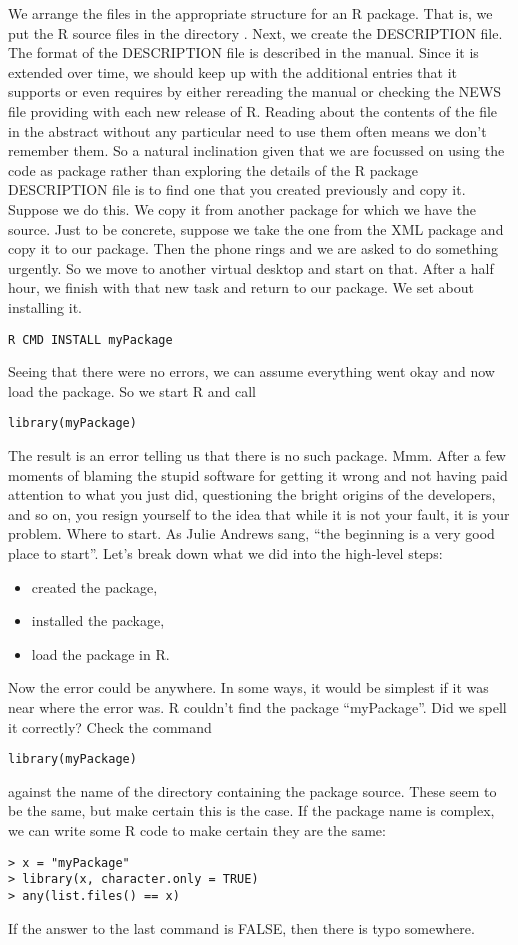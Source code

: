 We arrange the files in the appropriate structure for an R package.
That is, we put the R source files in the directory .  Next, we
create the DESCRIPTION file.  The format of the DESCRIPTION file is
described in the \cite{WritingRExtensions} manual. Since it is
extended over time, we should keep up with the additional entries that
it supports or even requires by either rereading the manual or
checking the NEWS file providing with each new release of R.  Reading
about the contents of the file in the abstract without any particular
need to use them often means we don't remember them.  So a natural
inclination given that we are focussed on using the code as package
rather than exploring the details of the R package DESCRIPTION file is
to find one that you created previously and copy it.  Suppose we do
this.  We copy it from another package for which we have the source.
Just to be concrete, suppose we take the one from the XML package and
copy it to our package.
Then the phone rings and we are asked to do something urgently.
So we move to another virtual desktop and start on that.
After a half hour, we finish with that new task and return to our
package. 
We set about installing it. 
\begin{verbatim}
R CMD INSTALL myPackage
\end{verbatim}
Seeing that there were no errors, we
can assume everything went okay and 
now load the package.
So we start R
and call
\begin{verbatim}
library(myPackage)
\end{verbatim}
The result is an error telling us that there is no such package.  Mmm.
After a few moments of blaming the stupid software for getting it
wrong and not having paid attention to what you just did, questioning
the bright origins of the developers, and so on, you resign yourself
to the idea that while it is not your fault, it is your problem.
Where to start.
As Julie Andrews sang, ``the beginning is a very good place to start''.
Let's break down what we did into the high-level steps:
\begin{itemize}
\item created the package,
\item installed the package,
\item load the package in R.
\end{itemize}
Now the error could be anywhere.
In some ways, it would be simplest if it
was near where the error was.
R couldn't find the package ``myPackage''.
Did we spell it correctly?
Check the command
\begin{verbatim}
library(myPackage)
\end{verbatim}
against the name of the directory 
containing the package source.
These seem to be the same, but make certain this is the case.
If the package name is complex, we can write some R code to make
certain
they are the same:
\begin{verbatim}
> x = "myPackage"
> library(x, character.only = TRUE)
> any(list.files() == x)
\end{verbatim}
If the answer to the last command is 
FALSE, then there is typo somewhere.

